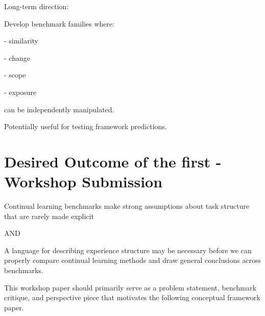 \documentclass{article}
\begin{document}
            Long-term direction:
            
            Develop benchmark families where:
            
            - similarity
            
            - change
            
            - scope
            
            - exposure
            
            can be independently manipulated.
            
            Potentially useful for testing framework predictions.

    
    
\section{Desired Outcome of the first - Workshop Submission}
             
        Continual learning benchmarks make strong assumptions about task structure that are rarely made explicit
        
        AND
        
        A language for describing experience structure may be necessary before we can properly compare continual learning methods and draw general conclusions across benchmarks.
        
        This workshop paper should primarily serve as a problem statement, benchmark critique, and perspective piece that motivates the following conceptual framework paper.



\end{document}
